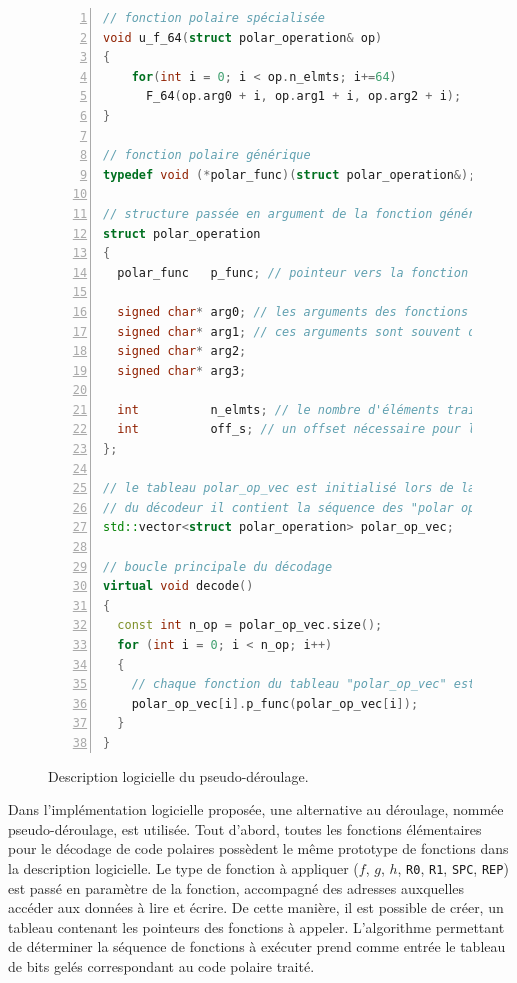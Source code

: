 \begin{figure}[htp]
\begin{lstlisting}[language=C++, numbers=left, numbersep=0.3em, tabsize=2, basicstyle=\footnotesize\ttfamily]
// fonction polaire spécialisée
void u_f_64(struct polar_operation& op)
{
    for(int i = 0; i < op.n_elmts; i+=64)
      F_64(op.arg0 + i, op.arg1 + i, op.arg2 + i);
}

// fonction polaire générique
typedef void (*polar_func)(struct polar_operation&);

// structure passée en argument de la fonction générique
struct polar_operation
{
  polar_func   p_func; // pointeur vers la fonction polaire spécialisée 

  signed char* arg0; // les arguments des fonctions polaires spécialisées
  signed char* arg1; // ces arguments sont souvent des adresses
  signed char* arg2;
  signed char* arg3;

  int          n_elmts; // le nombre d'éléments traités en parallèle
  int          off_s; // un offset nécessaire pour l'accès aux PSs
};

// le tableau polar_op_vec est initialisé lors de la construction
// du décodeur il contient la séquence des "polar operation"
std::vector<struct polar_operation> polar_op_vec;

// boucle principale du décodage
virtual void decode()
{
  const int n_op = polar_op_vec.size();
  for (int i = 0; i < n_op; i++)
  {
    // chaque fonction du tableau "polar_op_vec" est appelée
    polar_op_vec[i].p_func(polar_op_vec[i]); 
  }
}
\end{lstlisting}
\caption{Description logicielle du pseudo-déroulage.}
\label{fig:tensilica_code}
\end{figure}
Dans l'implémentation logicielle proposée, une alternative au déroulage, nommée pseudo-déroulage, est utilisée. Tout d'abord, toutes les fonctions élémentaires pour le décodage de code polaires possèdent le même prototype de fonctions dans la description logicielle. Le type de fonction à appliquer ($f$, $g$, $h$, \texttt{R0}, \texttt{R1}, \texttt{SPC}, \texttt{REP}) est passé en paramètre de la fonction, accompagné des adresses auxquelles accéder aux données à lire et écrire. De cette manière, il est possible de créer, un tableau contenant les pointeurs des fonctions à appeler. L'algorithme permettant de déterminer la séquence de fonctions à exécuter prend comme entrée le tableau de bits gelés correspondant au code polaire traité.

